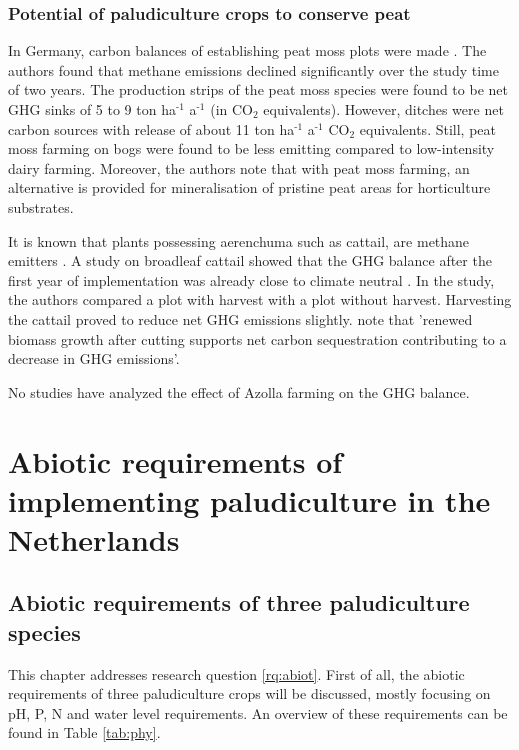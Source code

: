 \documentclass[a4paper,12pt]{scrbook}
\newcommand{\sur}[1]{\ensuremath{^{\textrm{#1}}}}
\newcommand{\sous}[1]{\ensuremath{_{\textrm{#1}}}}
\begin{document}
\subsection{Potential of paludiculture crops to conserve peat}
In Germany, carbon balances of establishing peat moss plots were made \citep{gunther2017greenhouse}. The authors found that methane emissions declined significantly over the study time of two years. The production strips of the peat moss  species were found to be net GHG sinks of 5 to 9 ton ha\sur{-1} a\sur{-1} (in CO\sous{2} equivalents). However, ditches were net carbon sources with release of about 11 ton ha\sur{-1} a\sur{-1} CO\sous{2} equivalents. Still, peat moss farming on bogs were found to be less emitting compared to low-intensity dairy farming. Moreover, the authors note that with peat moss farming, an alternative is provided for mineralisation of pristine peat areas for horticulture substrates.
 
It is known that plants possessing aerenchuma such as cattail, are methane emitters \citep{wichtmann2016paludiculture}. A study on broadleaf cattail showed that the GHG balance after the first year of implementation was already close to climate neutral \citep{guntherghgtypha}. In the study, the authors compared a plot with harvest with a plot without harvest. Harvesting the cattail proved to reduce net GHG emissions slightly. \citet{wichtmann2016paludiculture} note that 'renewed biomass growth after cutting supports net carbon sequestration contributing to a decrease in GHG emissions'. 

No studies have analyzed the effect of Azolla farming on the GHG balance. 

\chapter{Abiotic requirements of implementing paludiculture in the Netherlands} \label{ch:abiot}

\section{Abiotic requirements of three paludiculture species}

This chapter addresses research question \ref{rq:abiot}. First of all, the abiotic requirements of three paludiculture crops will be discussed, mostly focusing on pH, \ac{P}, \ac{N} and water level requirements. An overview of these requirements can be found in Table \ref{tab:phy}.
\end{document}
